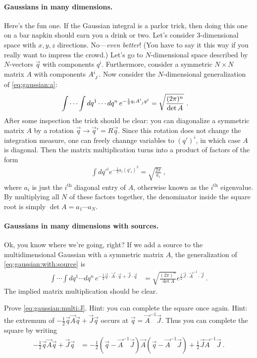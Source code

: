 \paragraph{Gaussians in many dimensions.} Here's the fun one. If the Gaussian integral is a parlor trick, then doing this one on a bar napkin should earn you a drink or two. Let's consider 3-dimensional space with $x,y,z$ directions. No---\emph{even better}! (You have to say it this way if you really want to impress the crowd.) Let's go to $N$-dimensional space described by $N$-vectors $\vec{q}$ with components $q^i$. Furthermore, consider a symmetric $N\times N$ matrix $A$ with components $\mat{A}{i}{j}$. Now consider the $N$-dimensional generalization of \eqref{eq:gaussian:a}:
\begin{align}
	\int\cdots\int dq^1\cdots dq^n \, e^{-\frac{1}{2} q_i \mat{A}{i}{j} q^j}
	&=
	\sqrt{\frac{(2\pi)^n}{\det A}} \ .
\end{align}
After some inspection the trick should be clear: you can diagonalize a symmetric matrix $A$ by a rotation $\vec{q}\to \vec{q}'= R\vec{q}$. Since this rotation does not change the integration measure, one can freely channge variables to $(q')^i$, in which case $A$ is diagonal. Then the matrix multiplication turns into a product of factors of the form
\begin{align}
	\int dq'^i e^{-\frac{1}{2} a_i(q'_i)^2} = \sqrt{\frac{2\pi}{a_i}} \ ,
\end{align}
where $a_i$ is just the $i^\text{th}$ diagonal entry of $A$, otherwise known as the $i^\text{th}$ eigenvalue. By multiplying all $N$ of these factors together, the denominator inside the square root is simply $\det A = a_1\cdots a_N$.

\paragraph{Gaussians in many dimensions with sources.} Ok, you know where we're going, right? If we add a source to the multidimensional Gaussian with a symmetric matrix $A$, the generalization of \eqref{eq:gaussian:with:source} is
\begin{align}
	\int\cdots\int dq^1\cdots dq^n \, e^{-\frac{1}{2} \vec{q}\cdot \vec{A}\cdot\vec{q} +\vec{J}\cdot\vec{q}}
	&=
	\sqrt{\frac{(2\pi)^n}{\det A}} 
	e^{\frac{1}{2}\vec{J}\cdot \vec{A}^{-1}\cdot\vec{J}} \ .
	\label{eq:gaussian:multi:J}
\end{align}
The implied matrix multiplication should be clear.
\begin{exercise}
Prove \eqref{eq:gaussian:multi:J}. Hint: you can complete the square once again. Hint: the extremum of $-\frac{1}{2} \vec{q} \vec{A} \vec{q} +\vec{J}\vec{q}$ occurs at $\vec{q} = \vec{A}^{-1}\vec{J}$.  Thus you can complete the square by writing
\begin{align}
	-\frac{1}{2} \vec{q} \vec{A}\vec{q} +\vec{J}\vec{q}
	&= 
	-\frac{1}{2} \left(\vec{q} - \vec{A}^{-1}\vec{J}\right) \vec{A}\left(\vec{q}-\vec{A}^{-1}\vec{J}\right) 
	+ \frac{1}{2}\vec{J} \vec{A}^{-1}\vec{J} \ .
\end{align}
\end{exercise}

